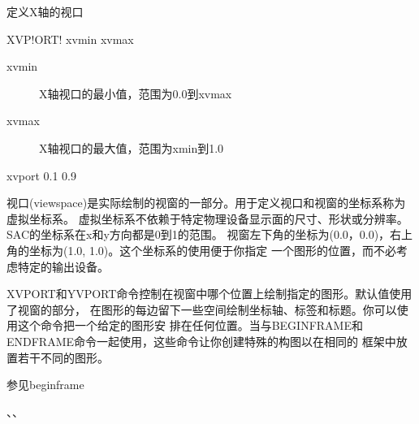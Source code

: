 \label{cmd:xvport}

定义X轴的视口

\begin{SACSTX}
XVP!ORT! xvmin xvmax
\end{SACSTX}

\begin{description}
\item [xvmin] X轴视口的最小值，范围为0.0到xvmax 
\item [xvmax] X轴视口的最大值，范围为xmin到1.0 
\end{description}

\begin{SACDFT}
xvport 0.1 0.9
\end{SACDFT}

视口(viewspace)是实际绘制的视窗的一部分。用于定义视口和视窗的坐标系称为虚拟坐标系。
虚拟坐标系不依赖于特定物理设备显示面的尺寸、形状或分辨率。SAC的坐标系在x和y方向都是0到1的范围。
视窗左下角的坐标为(0.0，0.0)，右上角的坐标为(1.0, 1.0)。这个坐标系的使用便于你指定
一个图形的位置，而不必考虑特定的输出设备。

XVPORT和YVPORT命令控制在视窗中哪个位置上绘制指定的图形。默认值使用了视窗的部分，
在图形的每边留下一些空间绘制坐标轴、标签和标题。你可以使用这个命令把一个给定的图形安
排在任何位置。当与BEGINFRAME和ENDFRAME命令一起使用，这些命令让你创建特殊的构图以在相同的
框架中放置若干不同的图形。

参见beginframe

、、
